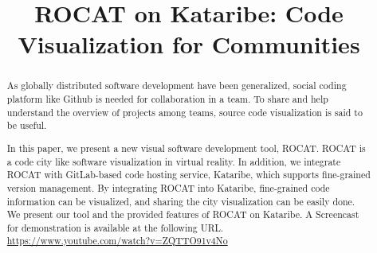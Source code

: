 \documentclass[conference]{IEEEtran}
\begin{document}
\title{ROCAT on Kataribe: Code Visualization for Communities}

\author{

}

\maketitle

\begin{abstract}
As globally distributed software development have been generalized, social coding platform like Github is needed for collaboration in a team. To share and help understand the overview of projects among teams, source code visualization is said to be useful.

In this paper, we present a new visual software development tool, ROCAT. ROCAT is a code city like software visualization in virtual reality. In addition, we integrate ROCAT with GitLab-based code hosting service, Kataribe, which supports fine-grained version management. By integrating ROCAT into Kataribe, fine-grained code information can be visualized, and sharing the city visualization can be easily done. We present our tool and the provided features of ROCAT on Kataribe.
A Screencast for demonstration is available at the following URL.\\
\url{https://www.youtube.com/watch?v=ZQTTO91v4No}
\end{abstract}
\end{document}
